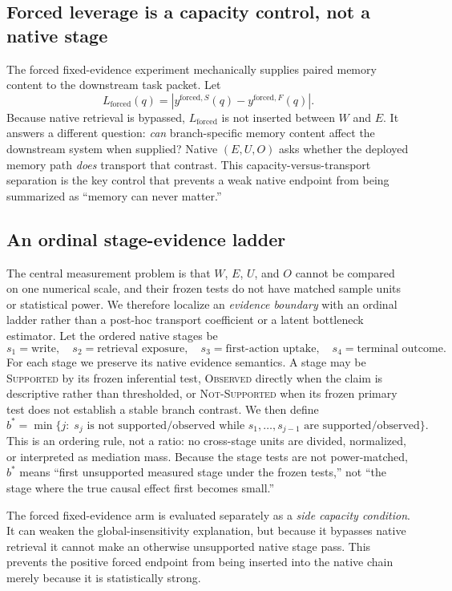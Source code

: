 \subsection{Forced leverage is a capacity control, not a native stage}
The forced fixed-evidence experiment mechanically supplies paired memory content to the downstream task packet. Let
\[
 L_{\mathrm{forced}}(q)=\left|y^{\mathrm{forced},S}(q)-y^{\mathrm{forced},F}(q)\right|.
\]
Because native retrieval is bypassed, $L_{\mathrm{forced}}$ is not inserted between $W$ and $E$. It answers a different question: \emph{can} branch-specific memory content affect the downstream system when supplied? Native $(E,U,O)$ asks whether the deployed memory path \emph{does} transport that contrast. This capacity-versus-transport separation is the key control that prevents a weak native endpoint from being summarized as ``memory can never matter.''

\subsection{An ordinal stage-evidence ladder}
\label{sec:evidence-ladder}
The central measurement problem is that $W$, $E$, $U$, and $O$ cannot be compared on one numerical scale, and their frozen tests do not have matched sample units or statistical power. We therefore localize an \emph{evidence boundary} with an ordinal ladder rather than a post-hoc transport coefficient or a latent bottleneck estimator. Let the ordered native stages be
\[
  s_1=\text{write},\quad s_2=\text{retrieval exposure},\quad s_3=\text{first-action uptake},\quad s_4=\text{terminal outcome}.
\]
For each stage we preserve its native evidence semantics. A stage may be \textsc{Supported} by its frozen inferential test, \textsc{Observed} directly when the claim is descriptive rather than thresholded, or \textsc{Not-Supported} when its frozen primary test does not establish a stable branch contrast. We then define
\[
  b^*=\min\{j:\;s_j\text{ is not supported/observed while }s_1,\ldots,s_{j-1}\text{ are supported/observed}\}.
\]
This is an ordering rule, not a ratio: no cross-stage units are divided, normalized, or interpreted as mediation mass. Because the stage tests are not power-matched, $b^*$ means ``first unsupported measured stage under the frozen tests,'' not ``the stage where the true causal effect first becomes small.''

The forced fixed-evidence arm is evaluated separately as a \emph{side capacity condition}. It can weaken the global-insensitivity explanation, but because it bypasses native retrieval it cannot make an otherwise unsupported native stage pass. This prevents the positive forced endpoint from being inserted into the native chain merely because it is statistically strong.


